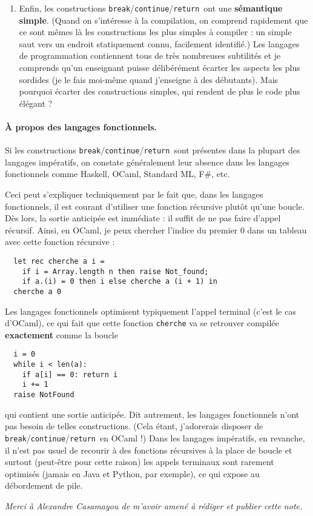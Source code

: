 \documentclass[a4paper,12pt]{article}
\newcommand{\bcr}{\texttt{break}/\texttt{continue}/\texttt{return}}
\begin{document}
\begin{enumerate}
\item Enfin, les constructions \bcr\ ont une
  \textbf{sémantique simple}. (Quand on s'intéresse à la compilation, on
  comprend rapidement que ce sont mêmes là les constructions les plus
  simples à compiler : un simple saut vers un endroit statiquement
  connu, facilement identifié.)  Les langages de programmation
  contiennent tous de très nombreuses subtilités et je comprends qu'un
  enseignant puisse délibérément écarter les aspects les plus sordides
  (je le fais moi-même quand j'enseigne à des débutants). Mais pourquoi
  écarter des constructions simples, qui rendent de plus le code plus
  élégant ?
\end{enumerate}

\paragraph{À propos des langages fonctionnels.}
Si les constructions \bcr\
sont présentes dans la plupart des langages impératifs, on constate
généralement leur absence dans les langages fonctionnels comme
Haskell, OCaml, Standard ML, F\#, etc.

Ceci peut s'expliquer techniquement par le fait que, dans les langages
fonctionnels, il est courant d'utiliser une fonction récursive plutôt
qu'une boucle. Dès lors, la sortie anticipée est immédiate : il suffit
de ne pas faire d'appel récursif. Ainsi, en OCaml, je peux chercher
l'indice du premier 0 dans un tableau avec cette fonction récursive :
\begin{verbatim}
  let rec cherche a i =
    if i = Array.length n then raise Not_found;
    if a.(i) = 0 then i else cherche a (i + 1) in
  cherche a 0
\end{verbatim}
Les langages fonctionnels optimisent typiquement l'appel terminal (c'est
le cas d'OCaml), ce qui fait que cette fonction \texttt{cherche} va se
retrouver compilée \textbf{exactement} comme la boucle
\begin{verbatim}
  i = 0
  while i < len(a):
    if a[i] == 0: return i
    i += 1
  raise NotFound
\end{verbatim}
qui contient une sortie anticipée. Dit autrement, les langages
fonctionnels n'ont pas besoin de telles constructions. (Cela étant,
j'adorerais disposer de
\bcr\ en OCaml !) Dans les
langages impératifs, en revanche, il n'est pas usuel de recourir à des
fonctions récursives à la place de boucle et surtout (peut-être pour
cette raison) les appels terminaux sont rarement optimisés (jamais en
Java et Python, par exemple), ce qui expose au débordement de pile.

\bigskip
\noindent \emph{Merci à Alexandre Casamayou de
  m'avoir amené à rédiger et publier cette note.}
\end{document}
